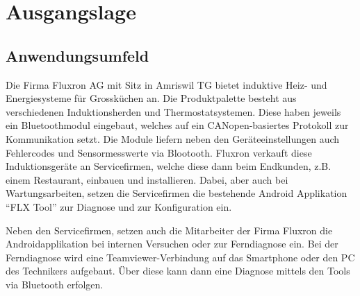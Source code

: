 
\section{Ausgangslage}
\label{sec:Ausgangslage}

\subsection{Anwendungsumfeld}
\label{subsec:Anwendungsumfeld}

Die Firma Fluxron AG mit Sitz in Amriswil TG bietet induktive Heiz- und Energiesysteme für Grossküchen an. Die Produktpalette besteht aus verschiedenen Induktionsherden und Thermostatsystemen. Diese haben jeweils ein Bluetoothmodul eingebaut, welches auf ein CANopen-basiertes Protokoll zur Kommunikation setzt. Die Module liefern neben den Geräteeinstellungen auch Fehlercodes und Sensormesswerte via Blootooth.
Fluxron verkauft diese Induktionsgeräte an Servicefirmen, welche diese dann beim Endkunden, z.B. einem Restaurant, einbauen und installieren. Dabei, aber auch bei Wartungsarbeiten, setzen die Servicefirmen die bestehende Android Applikation \enquote{FLX Tool} zur Diagnose und zur Konfiguration ein.

Neben den Servicefirmen, setzen auch die Mitarbeiter der Firma Fluxron die Androidapplikation bei internen Versuchen oder zur Ferndiagnose ein. Bei der Ferndiagnose wird eine Teamviewer-Verbindung auf das Smartphone oder den PC des Technikers aufgebaut. Über diese kann dann eine Diagnose mittels den Tools via Bluetooth erfolgen.

